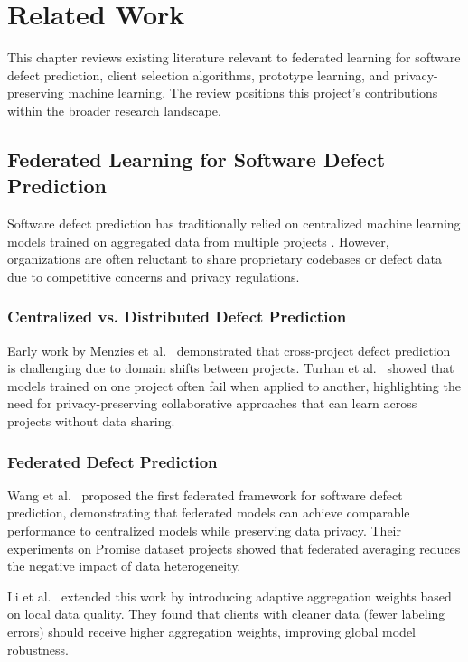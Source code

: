\chapter{Related Work}

This chapter reviews existing literature relevant to federated learning for software defect prediction, client selection algorithms, prototype learning, and privacy-preserving machine learning. The review positions this project's contributions within the broader research landscape.

\section{Federated Learning for Software Defect Prediction}

Software defect prediction has traditionally relied on centralized machine learning models trained on aggregated data from multiple projects \citep{hall2012systematic}. However, organizations are often reluctant to share proprietary codebases or defect data due to competitive concerns and privacy regulations.

\subsection{Centralized vs. Distributed Defect Prediction}

Early work by Menzies et al.~\citep{menzies2007promise} demonstrated that cross-project defect prediction is challenging due to domain shifts between projects. Turhan et al.~\citep{turhan2009empirical} showed that models trained on one project often fail when applied to another, highlighting the need for privacy-preserving collaborative approaches that can learn across projects without data sharing.

\subsection{Federated Defect Prediction}

Wang et al.~\citep{wang2021federated} proposed the first federated framework for software defect prediction, demonstrating that federated models can achieve comparable performance to centralized models while preserving data privacy. Their experiments on Promise dataset projects showed that federated averaging reduces the negative impact of data heterogeneity.

Li et al.~\citep{li2022defectfl} extended this work by introducing adaptive aggregation weights based on local data quality. They found that clients with cleaner data (fewer labeling errors) should receive higher aggregation weights, improving global model robustness.

